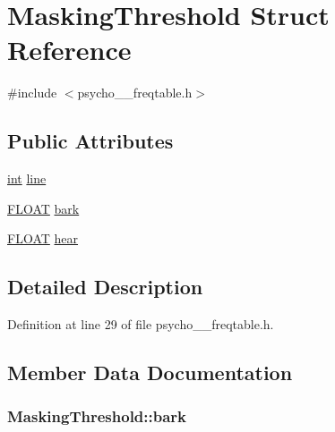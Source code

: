 \hypertarget{struct_masking_threshold}{}\section{Masking\+Threshold Struct Reference}
\label{struct_masking_threshold}


{\ttfamily \#include $<$psycho\+\_\+\_\+freqtable.\+h$>$}

\subsection*{Public Attributes}
\begin{DoxyCompactItemize}
\item 
\hyperlink{xmltok_8h_a5a0d4a5641ce434f1d23533f2b2e6653}{int} \hyperlink{struct_masking_threshold_a0944679cd4b49d65cf43757d5b52d3d0}{line}
\item 
\hyperlink{twolame_2libtwolame_2common_8h_ae8690abbffa85934d64d545920e2b108}{F\+L\+O\+AT} \hyperlink{struct_masking_threshold_ad367c543b5356d2c73d52ac4fe84c938}{bark}
\item 
\hyperlink{twolame_2libtwolame_2common_8h_ae8690abbffa85934d64d545920e2b108}{F\+L\+O\+AT} \hyperlink{struct_masking_threshold_a46773c811aa0f6cf6ce5d684c6375784}{hear}
\end{DoxyCompactItemize}


\subsection{Detailed Description}


Definition at line 29 of file psycho\+\_\+\_\+freqtable.\+h.



\subsection{Member Data Documentation}
\subsubsection[{\texorpdfstring{bark}{bark}}]{ Masking\+Threshold\+::bark}\hypertarget{struct_masking_threshold_ad367c543b5356d2c73d52ac4fe84c938}{}\label{struct_masking_threshold_ad367c543b5356d2c73d52ac4fe84c938}


